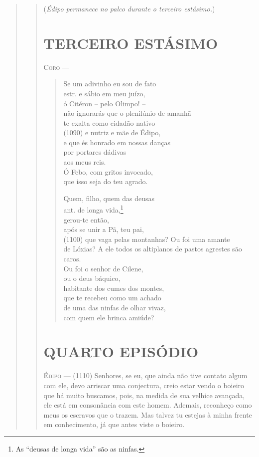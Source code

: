 \begin{verse}
\begin{verse}
(\emph{Édipo permanece no palco durante o terceiro estásimo.})

\section{TERCEIRO ESTÁSIMO}

\textsc{Coro} --- \begin{verse}Se um adivinho eu sou de fato\\ estr.
e sábio em meu juízo,\\
ó Citéron -- pelo Olimpo! --\\
não ignorarás que o plenilúnio de amanhã\\
te exalta como cidadão nativo\\ (1090)
e nutriz e mãe de Édipo,\\
e que és honrado em nossas danças\\
por portares dádivas\\
aos meus reis.\\
Ó Febo, com gritos invocado,\\
que isso seja do teu agrado.

Quem, filho, quem das deusas\\ ant.
de longa vida,\footnote{As ``deusas de longa vida'' são as ninfas.}\\
gerou-te então,\\
após se unir a Pã, teu pai,\\ (1100)
que vaga pelas montanhas? Ou foi uma amante\\
de Lóxias? A ele todos os altiplanos de pastos agrestes são caros.\\
Ou foi o senhor de Cilene,\\
ou o deus báquico,\\
habitante dos cumes dos montes,\\
que te recebeu como um achado\\
de uma das ninfas de olhar vivaz,\\
com quem ele brinca amiúde?
\end{verse}


\section{QUARTO EPISÓDIO}

\textsc{Édipo} --- (1110) Senhores, se eu, que ainda não tive contato algum com ele, devo
arriscar uma conjectura, creio estar vendo o boieiro que há muito
buscamos, pois, na medida de sua velhice avançada, ele está em
consonância com este homem. Ademais, reconheço como meus os escravos que
o trazem. Mas talvez tu estejas à minha frente em conhecimento, já que
antes viste o boieiro.


\end{verse}
\end{verse}
